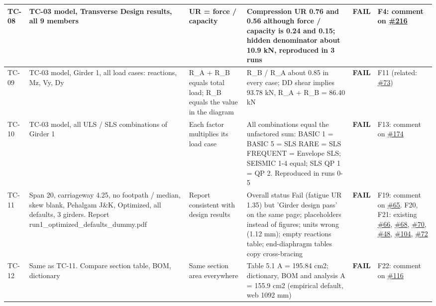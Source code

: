 \documentclass[10pt,a4paper]{article}
\begin{document}
{\begin{longtable}{|p{1.2cm}|p{6.2cm}|p{3.6cm}|p{7.2cm}|p{1.8cm}|p{3.6cm}|}
TC-08 & TC-03 model, Transverse Design results, all 9 members & UR = force / capacity & Compression UR 0.76 and 0.56 although force / capacity is 0.24 and 0.15; hidden denominator about 10.9 kN, reproduced in 3 runs & \textcolor{failc}{\textbf{FAIL}} & F4: comment on \href{https://github.com/Nidhikhare12/OsdagBridge/issues/216}{\#216} \\ \hline
TC-09 & TC-03 model, Girder 1, all load cases: reactions, Mz, Vy, Dy & R\_A + R\_B equals total load; R\_B equals the value in the diagram & R\_B / R\_A about 0.85 in every case; DD shear implies 93.78 kN, R\_A + R\_B = 86.40 kN & \textcolor{failc}{\textbf{FAIL}} & F11 (related: \href{https://github.com/Nidhikhare12/OsdagBridge/issues/73}{\#73}) \\ \hline
TC-10 & TC-03 model, all ULS / SLS combinations of Girder 1 & Each factor multiplies its load case & All combinations equal the unfactored sum: BASIC 1 = BASIC 5 = SLS RARE = SLS FREQUENT = Envelope SLS; SEISMIC 1-4 equal; SLS QP 1 = QP 2. Reproduced in runs 0-5 & \textcolor{failc}{\textbf{FAIL}} & F13: comment on \href{https://github.com/Nidhikhare12/OsdagBridge/issues/174}{\#174} \\ \hline
TC-11 & Span 20, carriageway 4.25, no footpath / median, skew blank, Pehalgam J\&K, Optimized, all defaults, 3 girders. Report run1\_optimized\_defaults\_dummy.pdf & Report consistent with design results & Overall status Fail (fatigue UR 1.35) but 'Girder design pass' on the same page; placeholders instead of figures; units wrong (1.12 mm); empty reactions table; end-diaphragm tables copy cross-bracing & \textcolor{failc}{\textbf{FAIL}} & F19: comment on \href{https://github.com/Nidhikhare12/OsdagBridge/issues/65}{\#65}. F20, F21: existing \href{https://github.com/Nidhikhare12/OsdagBridge/issues/66}{\#66}, \href{https://github.com/Nidhikhare12/OsdagBridge/issues/68}{\#68}, \href{https://github.com/Nidhikhare12/OsdagBridge/issues/70}{\#70}, \href{https://github.com/Nidhikhare12/OsdagBridge/issues/48}{\#48}, \href{https://github.com/Nidhikhare12/OsdagBridge/issues/104}{\#104}, \href{https://github.com/Nidhikhare12/OsdagBridge/issues/72}{\#72} \\ \hline
TC-12 & Same as TC-11. Compare section table, BOM, dictionary & Same section area everywhere & Table 5.1 A = 195.84 cm2; dictionary, BOM and analysis A = 155.9 cm2 (empirical default, web 1092 mm) & \textcolor{failc}{\textbf{FAIL}} & F22: comment on \href{https://github.com/Nidhikhare12/OsdagBridge/issues/116}{\#116} \\ \hline

\end{longtable}}
\end{document}
